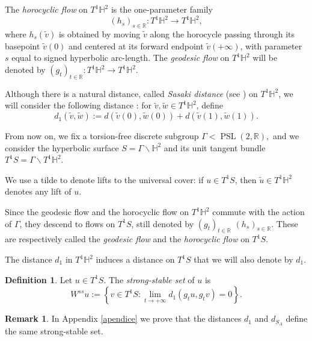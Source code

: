 \documentclass[a4paper,english,reqno]{amsart}
\renewcommand{\H}{\mathbb{H}}
\theoremstyle{definition}
\newtheorem{definition}[theorem]{Definition}
\newtheorem{remark}{Remark}
\numberwithin{equation}{section}
\begin{document}
The \emph{horocyclic flow} on $T^1\mathbb H^2$ is the one-parameter family
\[
(h_s)_{s\in\mathbb R}:T^1\mathbb H^2\to T^1\mathbb H^2,
\]
where $h_s(\tilde v)$ is obtained by moving $\tilde v$ along the horocycle passing through its basepoint $\tilde v(0)$ and centered at 
its forward endpoint $\tilde v(+\infty)$, with parameter $s$ equal to signed
hyperbolic arc-length. The \emph{geodesic flow} on $T^1\mathbb H^2$ will be denoted by $
(g_t)_{t\in\mathbb R}:T^1\mathbb H^2\to T^1\mathbb H^2. 
$ 


Although there is a natural distance, called \emph{Sasaki distance} (see \cite{Sasaki}) on $T^1\H^2$, we will consider the following distance \cite{Ballmann}: for $\tilde v,\tilde w\in T^1\mathbb H^2$, define
\[
d_1(\tilde v,\tilde w):=d(\tilde v(0),\tilde w(0))+d(\tilde v(1),\tilde w(1)).
\]



From now on, we fix a torsion-free discrete subgroup
$
\Gamma<\operatorname{PSL}(2,\mathbb R),
$
and we consider the hyperbolic surface
$
S=\Gamma\backslash \mathbb H^2
$
and its unit tangent bundle
$
T^1S=\Gamma\backslash T^1\mathbb H^2.
$

We use a tilde to denote lifts to the universal cover: if $u\in T^1S$, then
$\tilde u\in T^1\mathbb H^2$ denotes any lift of $u$.

Since the geodesic flow and the horocyclic flow on $T^1\mathbb H^2$ commute with
the action of $\Gamma$, they descend to flows on $T^1S$, still denoted by
$
(g_t)_{t\in\mathbb R}
$  $
(h_s)_{s\in\mathbb R}.
$
These are respectively called the \emph{geodesic flow} and the \emph{horocyclic flow}
on $T^1S$.


The distance $d_1$ in $T^1\H^2$ induces a distance on $T^1S$ that we will also denote by $d_1$.

\begin{definition}
	Let $u\in T^1S$. The \emph{strong-stable set} of $u$ is
	\[
	W^{ss}u:=\left\{v\in T^1S:\lim\limits_{t\to+\infty} d_1(g_t u,g_t v)=0\right\}.
	\]
\end{definition}

\begin{remark}
 In Appendix \ref{apendice}  we prove that the distances $d_1$ and $d_{S_A}$ define the same strong-stable set. 
\end{remark}

	
\end{document}
